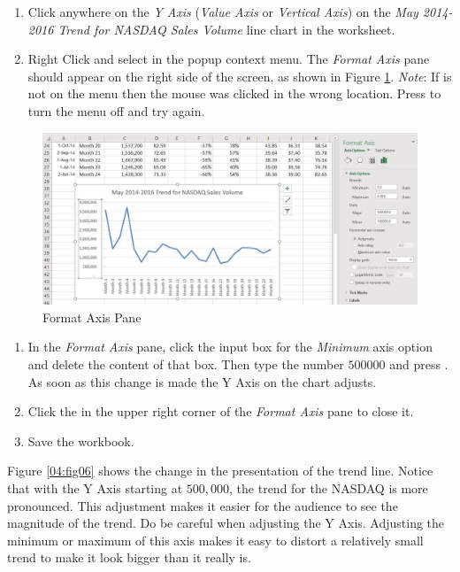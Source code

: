 \begin{enumerate}
	\item Click anywhere on the \textit{Y Axis} (\textit{Value Axis} or \textit{Vertical Axis}) on the \textit{May 2014-2016 Trend for NASDAQ Sales Volume} line chart in the  worksheet.
	\item Right Click and select  in the popup context menu. The \textit{Format Axis} pane should appear on the right side of the screen, as shown in Figure \ref{04:fig05}. \textit{Note}: If  is not on the menu then the mouse was clicked in the wrong location. Press  to turn the menu off and try again.
\end{enumerate}

\begin{figure}[H]
	\centering
	\includegraphics[width=\maxwidth{.95\linewidth}]{gfx/ch04_fig05}
	\caption{Format Axis Pane}
	\label{04:fig05}
\end{figure}

\begin{enumerate}[resume]
	\item In the \textit{Format Axis} pane, click the input box for the \textit{Minimum} axis option and delete the content of that box. Then type the number $ 500000 $ and press . As soon as this change is made the Y Axis on the chart adjusts.
	\item Click the  in the upper right corner of the \textit{Format Axis} pane to close it.
	\item Save the workbook.
\end{enumerate}

Figure \ref{04:fig06} shows the change in the presentation of the trend line. Notice that with the Y Axis starting at $ 500,000 $, the trend for the NASDAQ is more pronounced. This adjustment makes it easier for the audience to see the magnitude of the trend. Do be careful when adjusting the Y Axis. Adjusting the minimum or maximum of this axis makes it easy to distort a relatively small trend to make it look bigger than it really is.

